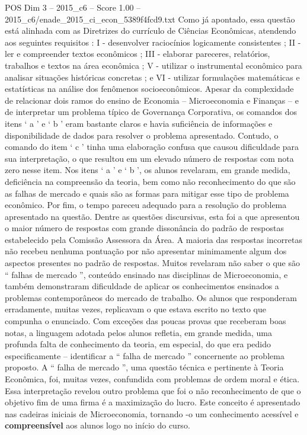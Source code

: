 \begin{textsample}{POS Dim 3 – 2015\_c6 – Score 1.00 – 2015\_c6/enade\_2015\_ci\_econ\_5389f4fcd9.txt}
Como já apontado, essa questão está alinhada com as Diretrizes do currículo de Ciências Econômicas, atendendo aos seguintes requisitos : I - desenvolver raciocínios logicamente consistentes ; II - ler e compreender textos econômicos ; III - elaborar pareceres, relatórios, trabalhos e textos na área econômica ; V - utilizar o instrumental econômico para analisar situações históricas concretas ; e VI - utilizar formulações matemáticas e estatísticas na análise dos fenômenos socioeconômicos.
Apesar da complexidade de relacionar dois ramos do ensino de Economia – Microeconomia e Finanças – e de interpretar um problema típico de Governança Corporativa, os comandos dos itens ‘ a ’ e ‘ b ’ eram bastante claros e havia suficiência de informações e disponibilidade de dados para resolver o problema apresentado.
Contudo, o comando do item ‘ c ’ tinha uma elaboração confusa que causou dificuldade para sua interpretação, o que resultou em um elevado número de respostas com nota zero nesse item.
Nos itens ‘ a ’ e ‘ b ’, os alunos revelaram, em grande medida, deficiência na compreensão da teoria, bem como não reconhecimento do que são as falhas de mercado e quais são as formas para mitigar esse tipo de problema econômico.
Por fim, o tempo pareceu adequado para a resolução do problema apresentado na questão.
Dentre as questões discursivas, esta foi a que apresentou o maior número de respostas com grande dissonância do padrão de respostas estabelecido pela Comissão Assessora da Área.
A maioria das respostas incorretas não recebeu nenhuma pontuação por não apresentar minimamente algum dos aspectos presentes no padrão de respostas.
Muitos revelaram não saber o que são “ falhas de mercado ”, conteúdo ensinado nas disciplinas de Microeconomia, e também demonstraram dificuldade de aplicar os conhecimentos ensinados a problemas contemporâneos do mercado de trabalho.
Os alunos que responderam erradamente, muitas vezes, replicavam o que estava escrito no texto que compunha o enunciado.
Com exceções das poucas provas que receberam boas notas, a linguagem adotada pelos alunos refletia, em grande medida, uma profunda falta de conhecimento da teoria, em especial, do que era pedido especificamente – identificar a “ falha de mercado ” concernente ao problema proposto.
A “ falha de mercado ”, uma questão técnica e pertinente à Teoria Econômica, foi, muitas vezes, confundida com problemas de ordem moral e ética.
Essa interpretação revelou outro problema que foi o não reconhecimento de que o objetivo fim de uma firma é a maximização do lucro.
Este conceito é apresentado nas cadeiras iniciais de Microeconomia, tornando -o um conhecimento acessível e \textbf{compreensível} aos alunos logo no início do curso.

\end{textsample}
